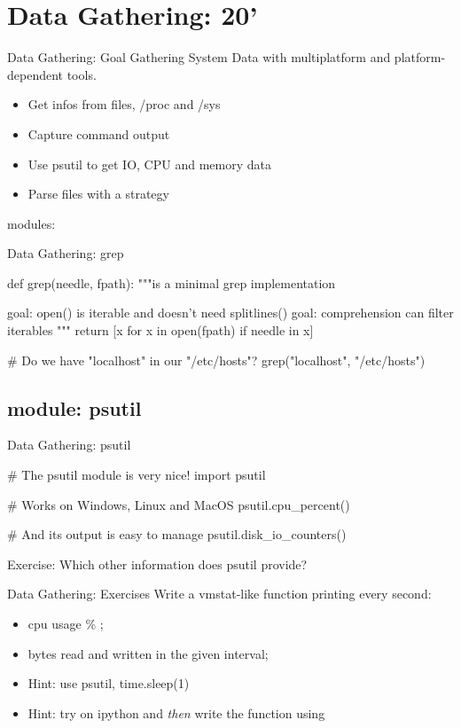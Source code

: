\section{Data Gathering: 20'}
%
%


\begin{pyframe}{Data Gathering: Goal}
    Gathering System Data with multiplatform
     and platform-dependent tools.
\begin{itemize}
\item Get infos from files, /proc and /sys 
\item Capture command output
\item Use psutil to get IO, CPU and memory data
\item Parse files with a strategy
\end{itemize}
modules: 
\end{pyframe}


\begin{pyframe}{Data Gathering: grep}
\begin{pycode}
def grep(needle, fpath):
    """is a minimal grep implementation

       goal: open() is iterable and doesn't
             need splitlines()
       goal: comprehension can filter iterables
    """
    return [x for x in open(fpath) if needle in x]
    
# Do we have "localhost" in our "/etc/hosts"?
grep("localhost", "/etc/hosts")
\end{pycode}
\end{pyframe}

\subsection{module: psutil}
\begin{pyframe}{Data Gathering: psutil}
\begin{pycode}
# The psutil module is very nice!
import psutil

# Works on Windows, Linux and MacOS
psutil.cpu_percent()

# And its output is easy to manage
psutil.disk_io_counters()

\end{pycode}
Exercise: Which other information does psutil provide?
\end{pyframe}


\begin{pyframe}{Data Gathering: Exercises}
Write a vmstat-like function printing every second:
\begin{itemize}
\item cpu usage \% ;
\item bytes read and written in the given interval;
\item Hint: use psutil, time.sleep(1)
\item Hint: try on ipython and \emph{then} write the function using \\\\
\end{itemize}
\end{pyframe}

